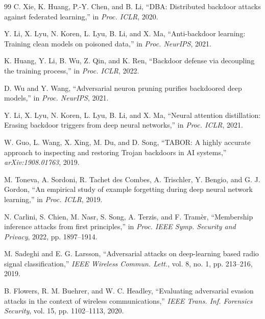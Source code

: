 \begin{thebibliography}{99}
C. Xie, K. Huang, P.-Y. Chen, and B. Li, ``DBA: Distributed backdoor attacks against federated learning,'' in \emph{Proc. ICLR}, 2020.

Y. Li, X. Lyu, N. Koren, L. Lyu, B. Li, and X. Ma, ``Anti-backdoor learning: Training clean models on poisoned data,'' in \emph{Proc. NeurIPS}, 2021.

K. Huang, Y. Li, B. Wu, Z. Qin, and K. Ren, ``Backdoor defense via decoupling the training process,'' in \emph{Proc. ICLR}, 2022.

D. Wu and Y. Wang, ``Adversarial neuron pruning purifies backdoored deep models,'' in \emph{Proc. NeurIPS}, 2021.

Y. Li, X. Lyu, N. Koren, L. Lyu, B. Li, and X. Ma, ``Neural attention distillation: Erasing backdoor triggers from deep neural networks,'' in \emph{Proc. ICLR}, 2021.

W. Guo, L. Wang, X. Xing, M. Du, and D. Song, ``TABOR: A highly accurate approach to inspecting and restoring Trojan backdoors in AI systems,'' \emph{arXiv:1908.01763}, 2019.

M. Toneva, A. Sordoni, R. Tachet des Combes, A. Trischler, Y. Bengio, and G. J. Gordon, ``An empirical study of example forgetting during deep neural network learning,'' in \emph{Proc. ICLR}, 2019.

N. Carlini, S. Chien, M. Nasr, S. Song, A. Terzis, and F. Tram\`er, ``Membership inference attacks from first principles,'' in \emph{Proc. IEEE Symp. Security and Privacy}, 2022, pp. 1897--1914.

M. Sadeghi and E. G. Larsson, ``Adversarial attacks on deep-learning based radio signal classification,'' \emph{IEEE Wireless Commun. Lett.}, vol. 8, no. 1, pp. 213--216, 2019.

B. Flowers, R. M. Buehrer, and W. C. Headley, ``Evaluating adversarial evasion attacks in the context of wireless communications,'' \emph{IEEE Trans. Inf. Forensics Security}, vol. 15, pp. 1102--1113, 2020.

\end{thebibliography}
